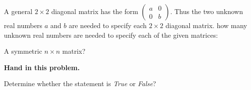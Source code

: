 \documentclass{ximera}
\begin{document}



\problemlabel

\noindent A general $2\times 2$ diagonal matrix has the form $\left(\begin{array}{rr} a & 0 \\ 0 & b\end{array}\right)$.  Thus the two unknown real numbers $a$ and $b$ are needed to specify each $2\times 2$ diagonal matrix.  how many unknown real numbers are needed to specify each of the given matrices:

\begin{exercise}  \label{c1.3.3c}
A symmetric $n\times n$ matrix?   

{\center\bf Hand in this problem.}
%
\end{exercise}





\problemlabel

\noindent Determine whether the statement is {\em True\/} or {\em False\/}?

\end{document}
